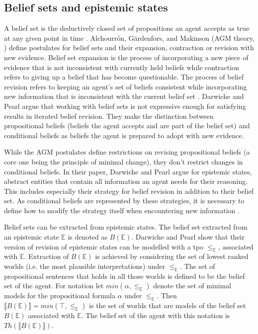 \documentclass[english, 12pt]{scrartcl}
\theoremstyle{definition}
\theoremstyle{definition}
\theoremstyle{definition}
\newcommand{\modelsOf}[1]{\llbracket #1 \rrbracket}
\begin{document}
\subsection{Belief sets and epistemic states}
\label{chapter:belief-sets-and-epistemic-states}
A belief set is the deductively closed set of propositions an agent accepts as true at any given point in time \cite{Ferme2011}. Alchourrón, Gärdenfors, and Makinson (AGM theory, \cite{Alchourron1985}) define postulates for belief sets and their expansion, contraction or revision with new evidence. Belief set expansion is the process of incorporating a new piece of evidence that is not inconsistent with currently held beliefs while contraction refers to giving up a belief that has become questionable. The process of belief revision refers to keeping an agent's set of beliefs consistent while incorporating new information that is inconsistent with the current belief set \cite{Katsuno1991, Gaerdenfors1984}. Darwiche and Pearl \cite{Darwiche1997} argue that working with belief sets is not expressive enough for satisfying results in iterated belief revision. They make the distinction between propositional beliefs (beliefs the agent accepts and are part of the belief set) and conditional beliefs as beliefs the agent is prepared to adopt with new evidence.

While the AGM postulates define restrictions on revising propositional beliefs (a core one being the principle of minimal change), they don't restrict changes in conditional beliefs. In their paper, Darwiche and Pearl argue for epistemic states, abstract entities that contain all information an agent needs for their reasoning. This includes especially their strategy for belief revision in addition to their belief set. As conditional beliefs are represented by these strategies, it is necessary to define how to modify the strategy itself when encountering new information \cite{Darwiche1997}.

Belief sets can be extracted from epistemic states. The belief set extracted from an epistemic state $\mathbb{E}$ is denoted as $B(\mathbb{E})$. Darwiche and Pearl show that their version of revision of epistemic states can be modelled with a tpo $\leq_{\mathbb{E}}$, associated with $\mathbb{E}$. Extraction of $B(\mathbb{E})$ is achieved by considering the set of lowest ranked worlds (i.e. the most plausible interpretations) under $\leq_{\mathbb{E}}$. The set of propositional sentences that holds in all those worlds is defined to be the belief set of the agent. For notation let $min(\alpha, \leq_{\mathbb{E}})$ denote the set of minimal models for the propositional formula $\alpha$ under $\leq_{\mathbb{E}}$. Then $\modelsOf{B(\mathbb{E})} = min(\top, \leq_{\mathbb{E}})$ is the set of worlds that are models of the belief set $B(\mathbb{E})$ associated with $\mathbb{E}$. The belief set of the agent with this notation is $Th(\modelsOf{B(\mathbb{E})})$.
\end{document}
